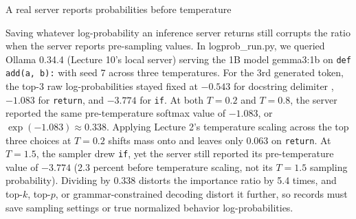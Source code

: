 \documentclass[aspectratio=169, 12pt]{beamer}
\begin{document}
\begin{frame}{A real server reports probabilities before temperature}
{    Saving whatever log-probability an inference server returns still corrupts the ratio when the server reports pre-sampling values. In logprob\_run.py, we queried Ollama 0.34.4 (Lecture 10's local server) serving the 1B model gemma3:1b on \texttt{def add(a, b):} with seed 7 across three temperatures. For the 3rd generated token, the top-3 raw log-probabilities stayed fixed at $-0.543$ for docstring delimiter \texttt{\textquotedbl\textquotedbl\textquotedbl}, $-1.083$ for \texttt{return}, and $-3.774$ for \texttt{if}. At both $T = 0.2$ and $T = 0.8$, the server reported the same pre-temperature softmax value of $-1.083$, or $\exp(-1.083) \approx 0.338$. Applying Lecture 2's temperature scaling across the top three choices at $T = 0.2$ shifts mass onto \texttt{\textquotedbl\textquotedbl\textquotedbl} and leaves only 0.063 on \texttt{return}. At $T = 1.5$, the sampler drew \texttt{if}, yet the server still reported its pre-temperature value of $-3.774$ (2.3 percent before temperature scaling, not its $T = 1.5$ sampling probability). Dividing by 0.338 distorts the importance ratio by 5.4 times, and top-$k$, top-$p$, or grammar-constrained decoding distort it further, so records must save sampling settings or true normalized behavior log-probabilities.

  }
\end{frame}
\end{document}
